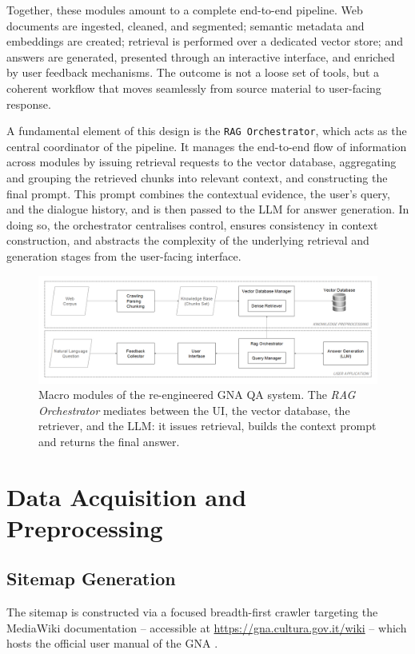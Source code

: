 \begin{spacing}{1.5}
Together, these modules amount to a complete end-to-end pipeline. Web documents are ingested, cleaned, and segmented; semantic metadata and embeddings are created; retrieval is performed over a dedicated vector store; and answers are generated, presented through an interactive interface, and enriched by user feedback mechanisms. The outcome is not a loose set of tools, but a coherent workflow that moves seamlessly from source material to user-facing response.

A fundamental element of this design is the \texttt{RAG Orchestrator}, which acts as the central coordinator of the pipeline. It manages the end-to-end flow of information across modules by issuing retrieval requests to the vector database, aggregating and grouping the retrieved chunks into relevant context, and constructing the final prompt. This prompt combines the contextual evidence, the user’s query, and the dialogue history, and is then passed to the LLM for answer generation. In doing so, the orchestrator centralises control, ensures consistency in context construction, and abstracts the complexity of the underlying retrieval and generation stages from the user-facing interface.


\begin{figure}[H]
  \centering
  \includegraphics[width=\textwidth]{images/dataflow_arch.png} 
  \caption{Macro modules of the re-engineered GNA QA system. The \emph{RAG Orchestrator} mediates between the UI, the vector database, the retriever, and the LLM: it issues retrieval, builds the context prompt and returns the final answer.}
  \label{fig:dataflow}
\end{figure}

\sloppy
\section{Data Acquisition and Preprocessing}
\subsection{Sitemap Generation}
The sitemap is constructed via a focused breadth-first crawler targeting the MediaWiki documentation -- accessible at \url{https://gna.cultura.gov.it/wiki} -- which hosts the official user manual of the GNA \citep{mic_mic_2019}. 


\end{spacing}
